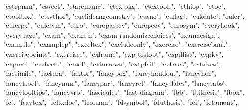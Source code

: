 \documentclass[
]{article}
\newenvironment{Shaded}{\begin{snugshade}}{\end{snugshade}}
\newcommand{\NormalTok}[1]{#1}
\newcommand{\StringTok}[1]{\textcolor[rgb]{0.31,0.60,0.02}{#1}}
\begin{document}
\begin{Shaded}
\begin{Highlighting}[]
\StringTok{"estcpmm"}\NormalTok{, }\StringTok{"esvect"}\NormalTok{, }\StringTok{"etaremune"}\NormalTok{, }\StringTok{"etex{-}pkg"}\NormalTok{, }\StringTok{"etextools"}\NormalTok{, }\StringTok{"ethiop"}\NormalTok{, }
\StringTok{"etoc"}\NormalTok{, }\StringTok{"etoolbox"}\NormalTok{, }\StringTok{"etsvthor"}\NormalTok{, }\StringTok{"euclideangeometry"}\NormalTok{, }\StringTok{"euenc"}\NormalTok{, }
\StringTok{"euflag"}\NormalTok{, }\StringTok{"eukdate"}\NormalTok{, }\StringTok{"euler"}\NormalTok{, }\StringTok{"eulerpx"}\NormalTok{, }\StringTok{"eulervm"}\NormalTok{, }\StringTok{"euro"}\NormalTok{, }\StringTok{"europasscv"}\NormalTok{, }
\StringTok{"europecv"}\NormalTok{, }\StringTok{"eurosym"}\NormalTok{, }\StringTok{"everyhook"}\NormalTok{, }\StringTok{"everypage"}\NormalTok{, }\StringTok{"exam"}\NormalTok{, }\StringTok{"exam{-}n"}\NormalTok{, }
\StringTok{"exam{-}randomizechoices"}\NormalTok{, }\StringTok{"examdesign"}\NormalTok{, }\StringTok{"example"}\NormalTok{, }\StringTok{"examplep"}\NormalTok{, }
\StringTok{"exceltex"}\NormalTok{, }\StringTok{"excludeonly"}\NormalTok{, }\StringTok{"exercise"}\NormalTok{, }\StringTok{"exercisebank"}\NormalTok{, }\StringTok{"exercisepoints"}\NormalTok{, }
\StringTok{"exercises"}\NormalTok{, }\StringTok{"exframe"}\NormalTok{, }\StringTok{"exp{-}testopt"}\NormalTok{, }\StringTok{"expdlist"}\NormalTok{, }\StringTok{"expkv"}\NormalTok{, }\StringTok{"export"}\NormalTok{, }
\StringTok{"exsheets"}\NormalTok{, }\StringTok{"exsol"}\NormalTok{, }\StringTok{"extarrows"}\NormalTok{, }\StringTok{"extpfeil"}\NormalTok{, }\StringTok{"extract"}\NormalTok{, }\StringTok{"extsizes"}\NormalTok{, }
\StringTok{"facsimile"}\NormalTok{, }\StringTok{"factura"}\NormalTok{, }\StringTok{"faktor"}\NormalTok{, }\StringTok{"fancybox"}\NormalTok{, }\StringTok{"fancyhandout"}\NormalTok{, }
\StringTok{"fancyhdr"}\NormalTok{, }\StringTok{"fancylabel"}\NormalTok{, }\StringTok{"fancynum"}\NormalTok{, }\StringTok{"fancypar"}\NormalTok{, }\StringTok{"fancyref"}\NormalTok{, }
\StringTok{"fancyslides"}\NormalTok{, }\StringTok{"fancytabs"}\NormalTok{, }\StringTok{"fancytooltips"}\NormalTok{, }\StringTok{"fancyvrb"}\NormalTok{, }\StringTok{"fascicules"}\NormalTok{, }
\StringTok{"fast{-}diagram"}\NormalTok{, }\StringTok{"fbb"}\NormalTok{, }\StringTok{"fbithesis"}\NormalTok{, }\StringTok{"fbox"}\NormalTok{, }\StringTok{"fc"}\NormalTok{, }\StringTok{"fcavtex"}\NormalTok{, }
\StringTok{"fcltxdoc"}\NormalTok{, }\StringTok{"fcolumn"}\NormalTok{, }\StringTok{"fdsymbol"}\NormalTok{, }\StringTok{"fduthesis"}\NormalTok{, }\StringTok{"fei"}\NormalTok{, }\StringTok{"fetamont"}\NormalTok{, }

\end{Highlighting}
\end{Shaded}
\end{document}
